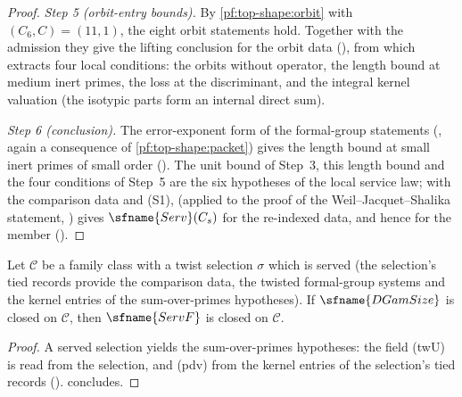 \begin{proof}
\emph{Step 5 (orbit-entry bounds).} By \cref{pf:top-shape:orbit} with $(C_6,C)=(11,1)$, the eight orbit statements
hold. Together with the admission they give the lifting conclusion for the orbit data
(), from which
 extracts four local conditions: the orbits without
operator, the length bound at medium inert primes, the loss at the discriminant, and the integral kernel valuation
(the isotypic parts form an internal direct sum).

\emph{Step 6 (conclusion).} The error-exponent form of the formal-group statements
(, again a consequence of
\cref{pf:top-shape:packet}) gives the length bound at small inert primes of small order
(). The unit bound of Step~3, this
length bound and the four conditions of Step~5 are the six hypotheses of the local service law; with the comparison
data and (S1),  (applied to the proof of the
Weil--Jacquet--Shalika statement, ) gives
$\sfname{Serv}(C_s)$ for the re-indexed data, and hence for the member
().
\end{proof}

\begin{corollary}\label{pf:top-shape:servT}
Let $\mathcal C$ be a family class with a twist selection $\sigma$ which is served (the selection's tied records provide
the comparison data, the twisted formal-group systems and the kernel entries of the sum-over-primes hypotheses). If
$\sfname{DGamSize}$ is closed on $\mathcal C$, then $\sfname{ServF}$ is closed on $\mathcal C$.
\end{corollary}

\begin{proof}
A served selection yields the sum-over-primes hypotheses: the field (twU) is read from the selection, and (pdv) from
the kernel entries of the selection's tied records
().  concludes.
\end{proof}

